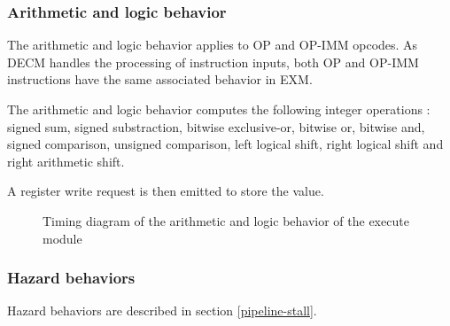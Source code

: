       

    \subsubsection{Arithmetic and logic behavior}

      \begin{content}
          The arithmetic and logic behavior applies to OP and OP-IMM opcodes. As DECM handles the processing of instruction inputs, both OP and OP-IMM instructions have the same associated behavior in EXM.

          The arithmetic and logic behavior computes the following integer operations : signed sum, signed substraction, bitwise exclusive-or, bitwise or, bitwise and, signed comparison, unsigned comparison, left logical shift, right logical shift and right arithmetic shift.
          
          A register write request is then emitted to store the value.
        \end{content}

      \begin{figure}[H]
          \centering
          
          \caption{Timing diagram of the arithmetic and logic behavior of the execute module}
          \label{fig:exm-behavior-arithmetic-logic}
        \end{figure}

      

    \subsubsection{Hazard behaviors}

      \begin{content}
          Hazard behaviors are described in section \ref{pipeline-stall}.
        \end{content}

\newpage
